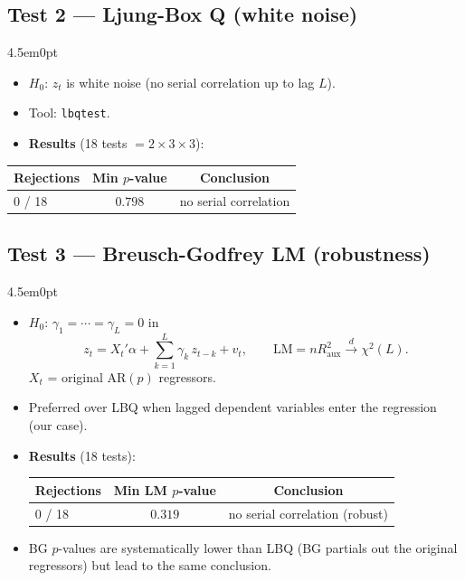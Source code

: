 \documentclass[12pt]{article}
\newenvironment{bodyL3}{\begin{adjustwidth}{4.5em}{0pt}}{\end{adjustwidth}}
\begin{document}
\subsection{Test 2 --- Ljung-Box Q (white noise)}
\begin{bodyL3}
\begin{itemize}
    \item $H_0$: $z_t$ is white noise (no serial correlation up to lag $L$). \item Tool: \texttt{lbqtest}.
    \item \textbf{Results} (18 tests $= 2 \times 3 \times 3$):
\end{itemize}

\begin{center}
\renewcommand{\arraystretch}{1.15}
\begin{tabular}{lcc}
\toprule
Rejections & Min $p$-value & Conclusion \\
\midrule
0 / 18 & $0.798$ & no serial correlation \\
\bottomrule
\end{tabular}
\end{center}
\end{bodyL3}

\subsection{Test 3 --- Breusch-Godfrey LM (robustness)}
\begin{bodyL3}
\begin{itemize}
    \item $H_0$: $\gamma_1 = \cdots = \gamma_L = 0$ in
\[
    z_t = X_t'\alpha + \sum_{k=1}^{L}\gamma_k\, z_{t-k} + v_t,
    \qquad
    \mathrm{LM} = n R^2_{\text{aux}} \xrightarrow{d} \chi^2(L).
\]
$X_t$ = original AR$(p)$ regressors.
    \item Preferred over LBQ when lagged dependent variables enter the regression (our case).
    \item \textbf{Results} (18 tests):


\begin{center}
\renewcommand{\arraystretch}{1.15}
\begin{tabular}{lcc}
\toprule
Rejections & Min LM $p$-value & Conclusion \\
\midrule
0 / 18 & $0.319$ & no serial correlation (robust) \\
\bottomrule
\end{tabular}
\end{center}

\item BG $p$-values are systematically lower than LBQ (BG partials out the original
regressors) but lead to the same conclusion.
\end{itemize}
\end{bodyL3}
\end{document}
